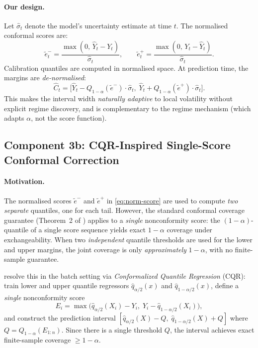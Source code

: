 \paragraph{Our design.}
Let $\hat{\sigma}_t$ denote the model's uncertainty estimate at time $t$.
The normalised conformal scores are:
\begin{equation}\label{eq:norm-score}
  \tilde{e}_t^{-} = \frac{\max(0,\, \hat{Y}_t - Y_t)}{\hat{\sigma}_t},
  \qquad
  \tilde{e}_t^{+} = \frac{\max(0,\, Y_t - \hat{Y}_t)}{\hat{\sigma}_t}.
\end{equation}
Calibration quantiles are computed in normalised space.  At prediction time,
the margins are \emph{de-normalised}:
\begin{equation}\label{eq:denorm}
  \hat{C}_t = \bigl[\hat{Y}_t - Q_{1-\alpha}(\tilde{e}^{-})
    \cdot \hat{\sigma}_t,\;
  \hat{Y}_t + Q_{1-\alpha}(\tilde{e}^{+}) \cdot \hat{\sigma}_t\bigr].
\end{equation}
This makes the interval width \emph{naturally adaptive} to local
volatility without explicit regime discovery, and is complementary to the
regime mechanism (which adapts $\alpha$, not the score function).

\subsection{Component 3b: CQR-Inspired Single-Score Conformal Correction}
\label{sec:cqr-score}

\paragraph{Motivation.}
The normalised scores $\tilde{e}^{-}$ and $\tilde{e}^{+}$ in
\eqref{eq:norm-score} are used to compute \emph{two separate} quantiles,
one for each tail.  However, the standard conformal coverage guarantee
(Theorem~2 of \citealt{vovk2005algorithmic}) applies to a \emph{single}
nonconformity score: the $(1-\alpha)$-quantile of a single score sequence
yields exact $1-\alpha$ coverage under exchangeability.  When two
\emph{independent} quantile thresholds are used for the lower and upper
margins, the joint coverage is only \emph{approximately} $1-\alpha$, with
no finite-sample guarantee.

\citet{romano2019conformalized} resolve this in the batch setting via
\emph{Conformalized Quantile Regression} (CQR): train lower and upper
quantile regressors $\hat{q}_{\alpha/2}(x)$ and
$\hat{q}_{1-\alpha/2}(x)$, define a \emph{single} nonconformity score
\begin{equation}\label{eq:cqr-score-orig}
  E_i = \max\!\bigl(\hat{q}_{\alpha/2}(X_i) - Y_i,\;
  Y_i - \hat{q}_{1-\alpha/2}(X_i)\bigr),
\end{equation}
and construct the prediction interval
$[\hat{q}_{\alpha/2}(X) - Q,\; \hat{q}_{1-\alpha/2}(X) + Q]$
where $Q = Q_{1-\alpha}(E_{1:n})$.  Since there is a single threshold
$Q$, the interval achieves exact finite-sample coverage $\ge 1-\alpha$.

